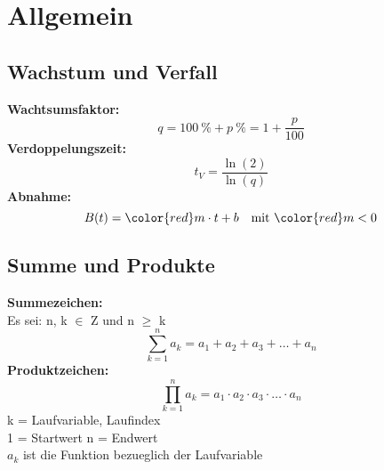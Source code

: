 \section*{Allgemein}
\begin{multicols}{3}
\subsection*{Wachstum und Verfall}
\textbf{Wachtsumsfaktor:}
\begin{equation*}
    q = 100\ \% + p\ \% = 1 + \frac{p}{100}
\end{equation*} 
\textbf{Verdoppelungszeit:}
\begin{equation*}
    t_V = \frac{\ln(2)}{\ln(q)}
\end{equation*}
\textbf{Abnahme:}
\begin{equation*}
    B(t) = {\color{red}m} \cdot t + b \quad \text{mit } {\color{red}m < 0}
\end{equation*}

\subsection*{Summe und Produkte}
\textbf{Summezeichen:} \\
Es sei:  n, k $\in$ Z und n $\geq$ k
\begin{equation*}
    \sum_{k=1}^{n} a_k = a_1 + a_2 + a_3 + \ldots + a_n 
\end{equation*}
\textbf{Produktzeichen:}
\begin{equation*}
    \prod_{k=1}^{n} a_k = a_1 \cdot a_2 \cdot a_3 \cdot \ldots \cdot a_n
\end{equation*}
k = Laufvariable, Laufindex  \\
1 = Startwert  n = Endwert\\
$a_{k}$ ist die Funktion bezueglich der Laufvariable \\


\end{multicols}
